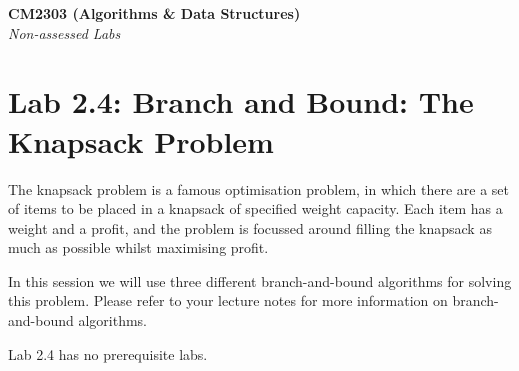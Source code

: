 \documentclass[11pt,a4paper]{report}
\begin{document}
\noindent\Large\textbf{CM2303 (Algorithms \& Data Structures)}\\
\noindent\large\textit{Non-assessed Labs}
\vskip30pt

\section*{Lab 2.4: Branch and Bound: The Knapsack Problem}

The knapsack problem is a famous optimisation problem, in which there are a set of items to be placed in a knapsack of specified weight capacity. Each item has a weight and a profit, and the problem is focussed around filling the knapsack as much as possible whilst maximising profit.

In this session we will use three different branch-and-bound algorithms for solving this problem. Please refer to your lecture notes for more information on branch-and-bound algorithms.

Lab 2.4 has no prerequisite labs.
\end{document}
